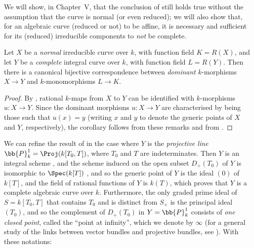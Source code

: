
\begin{remark}[7.4.12]
\label{II.7.4.12}
We will show, in Chapter~V, that the conclusion of  still holds true without the assumption that the curve is normal (or even reduced);
we will also show that, for an algebraic curve (reduced or not) to be affine, it is necessary and sufficient for its (reduced) irreducible components to \emph{not} be complete.
\end{remark}

\begin{corollary}[7.4.13]
\label{II.7.4.13}
Let $X$ be a \emph{normal} irreducible curve over $k$, with function field $K=R(X)$, and let $Y$ be a \emph{complete} integral curve over $k$, with function field $L=R(Y)$.
Then there is a canonical bijective correspondence between \emph{dominant} $k$-morphisms $X\to Y$ and $k$-monomorphisms $L\to K$.
\end{corollary}

\begin{proof}
By , rational $k$-maps from $X$ to $Y$ can be identified with $k$-morphisms $u:X\to Y$.
Since the dominant morphisms $u:X\to Y$ are characterised by being those such that $u(x)=y$ (writing $x$ and $y$ to denote the generic points of $X$ and $Y$, respectively), the corollary follows from these remarks and from .
\end{proof}

\begin{env}[7.4.14]
\label{II.7.4.14}
We can refine the result of  in the case where $Y$ is the \emph{projective line} $\bb{P}_k^1=\Proj(k[T_0,T])$, where $T_0$ and $T$ are indeterminates.
Then $Y$ is an integral scheme , and the scheme induced on the open subset $D_+(T_0)$ of $Y$ is isomorphic to $\Spec(k[T])$ , and so the generic point of $Y$ is the ideal $(0)$ of $k[T]$, and the field of rational functions of $Y$ is $k(T)$, which proves that $Y$ is a complete algebraic curve over $k$.
Furthermore, the only graded prime ideal of $S=k[T_0,T]$ that contains $T_0$ and is distinct from $S_+$ is the principal ideal $(T_0)$, and so the complement of $D_+(T_0)$ in $Y=\bb{P}_k^1$ consists of \emph{one closed point}, called the ``point at infinity'', which we denote by $\infty$ (for a general study of the links between vector bundles and projective bundles, see ).
With these notations:
\end{env}

